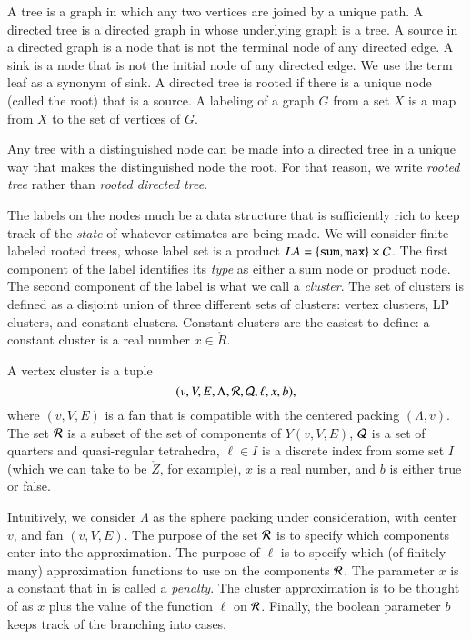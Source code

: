 
\begin{definition}
A tree is a graph in which any two vertices are joined by a unique path.
A directed tree is a directed graph in whose underlying graph is a tree.
A source in a directed graph is a node that is not the terminal node
of any directed edge.  A sink is a node that is not the initial node
of any directed edge.  We use the term leaf as a synonym of sink.
A directed tree is rooted if there is a unique node (called
the root) that is a source.
A labeling of a graph $G$ from a set $X$ is a map from $X$ to the set
of vertices of $G$.
\end{definition}

Any tree with a distinguished node can be made into a directed
tree in a unique way that makes the distinguished node the root. 
For that reason, we write {\it rooted tree} rather than
{\it rooted directed tree}.

The labels on the nodes much be a data structure that is sufficiently
rich to keep track of the {\it state} of whatever estimates are
being made.
We will consider finite labeled rooted trees, whose label set
is a product $LA=\{{\tt sum, max}\} \times {\cal C}$.   The first
component of the label identifies its {\it type} as either a sum
node or product node. 
The second component of the label is what we call a {\it cluster}.
The set of clusters is defined as a disjoint union of three different sets
of clusters:  vertex clusters, LP clusters, and constant clusters.
Constant clusters are the easiest to define: a constant cluster
is a real number $x\in\ring{R}$.  

\begin{definition}
A vertex
cluster is a tuple
    $$
    (v,V,E,\Lambda,{\cal R},{\cal Q},\ell,x,b),
    $$
where $(v,V,E)$ is a fan that is compatible with
the centered packing $(\Lambda,v)$.  
The set ${\cal R}$ is a subset of the set of components of $Y(v,V,E)$,
${\cal Q}$ is a set of quarters and quasi-regular tetrahedra,
$\ell\in I$ is a discrete index from some set $I$ (which we can
take to be $\ring{Z}$, for example), 
$x$ is a real number, and
$b$ is either true or false.
\end{definition}

Intuitively, we consider $\Lambda$ as the sphere packing under
consideration, with center $v$, and fan $(v,V,E)$.
The purpose of the set ${\cal R}$ is to specify which components
enter into the approximation.  The purpose of $\ell$ is to specify
which (of finitely many) approximation functions to use on the
components ${\cal R}$.  The parameter $x$ is a constant that in \cite{DCG}
is called a {\it penalty}.  The cluster approximation is to be
thought of as $x$ plus the value of the function $\ell$ on ${\cal R}$.
Finally, the boolean parameter $b$ keeps track of the branching into
cases.


